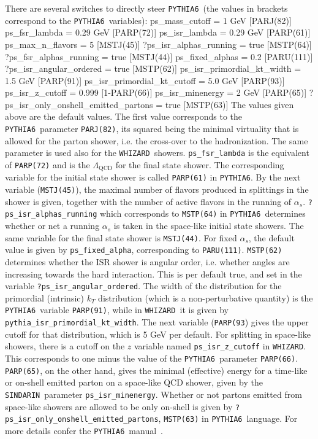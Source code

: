\documentclass[12pt]{book}
\newenvironment{code}%
  {\begingroup\footnotesize
   \quote
   \Verbatim}%
  {\endVerbatim
   \endquote
   \endgroup\noindent}
\newcommand{\ttt}[1]{\texttt{#1}}
\newcommand{\whizard}{\ttt{WHIZARD}}
\newcommand{\pythiasix}{\ttt{PYTHIA6}}
\newcommand{\sindarin}{\ttt{SINDARIN}}
\begin{document}
There are several switches to directly steer \pythiasix\ (the values
in brackets correspond to the \pythiasix\ variables):
\begin{code}
  ps_mass_cutoff = 1 GeV                  [PARJ(82)]
  ps_fsr_lambda = 0.29 GeV                [PARP(72)]
  ps_isr_lambda = 0.29 GeV                [PARP(61)]
  ps_max_n_flavors = 5                    [MSTJ(45)]
  ?ps_isr_alphas_running = true           [MSTP(64)]
  ?ps_fsr_alphas_running = true           [MSTJ(44)]
  ps_fixed_alphas = 0.2                   [PARU(111)]
  ?ps_isr_angular_ordered = true          [MSTP(62)]
  ps_isr_primordial_kt_width = 1.5 GeV    [PARP(91)]
  ps_isr_primordial_kt_cutoff = 5.0 GeV   [PARP(93)]
  ps_isr_z_cutoff = 0.999                 [1-PARP(66)]
  ps_isr_minenergy = 2 GeV                [PARP(65)]
  ?ps_isr_only_onshell_emitted_partons =
        true                              [MSTP(63)]
\end{code}
The values given above are the default values. The first value
corresponds to the \pythiasix\ parameter \ttt{PARJ(82)}, its
squared being the minimal virtuality that is allowed for the parton
shower, i.e. the cross-over to the hadronization. The same parameter
is used also for the \whizard\ showers. \ttt{ps\_fsr\_lambda} is
the equivalent of \ttt{PARP(72)} and is the $\Lambda_{\text{QCD}}$
for the final state shower. The corresponding variable for the initial
state shower is called \ttt{PARP(61)} in \pythiasix. By the next
variable (\ttt{MSTJ(45)}), the maximal number of flavors produced
in splittings in the shower is given, together with the number of
active flavors in the running of
$\alpha_s$. \ttt{?ps\_isr\_alphas\_running} which corresponds to
\ttt{MSTP(64)} in \pythiasix\ determines whether or net a running
$\alpha_s$ is taken in the space-like initial state showers. The same
variable for the final state shower is \ttt{MSTJ(44)}. For fixed
$\alpha_s$, the default value is given by \ttt{ps\_fixed\_alpha},
corresponding to \ttt{PARU(111)}. \ttt{MSTP(62)} determines
whether the ISR shower is angular order, i.e. whether angles are
increasing towards the hard interaction. This is per default true, and
set in the variable \ttt{?ps\_isr\_angular\_ordered}. The width of
the distribution for the primordial (intrinsic) $k_T$ distribution
(which is a non-perturbative quantity) is the \pythiasix\ variable
\ttt{PARP(91)}, while in \whizard\ it is given by
\ttt{pythia\_isr\_primordial\_kt\_width}. The next variable
(\ttt{PARP(93}) gives the upper cutoff for that distribution, which
is 5 GeV per default. For splitting in space-like showers, there is a
cutoff on the $z$ variable named \ttt{ps\_isr\_z\_cutoff} in
\whizard. This corresponds to one minus the value of the
\pythiasix\ parameter \ttt{PARP(66)}. \ttt{PARP(65)}, on the
other hand, gives the minimal (effective) energy for a time-like or
on-shell emitted parton on a space-like QCD shower, given by the
\sindarin\ parameter \ttt{ps\_isr\_minenergy}. Whether or not
partons emitted from space-like showers are allowed to be only
on-shell is given by
\ttt{?ps\_isr\_only\_onshell\_emitted\_partons}, \ttt{MSTP(63)}
in \pythiasix\ language.
For more details confer the
\pythiasix\ manual~\cite{Sjostrand:2006za}.
\end{document}
